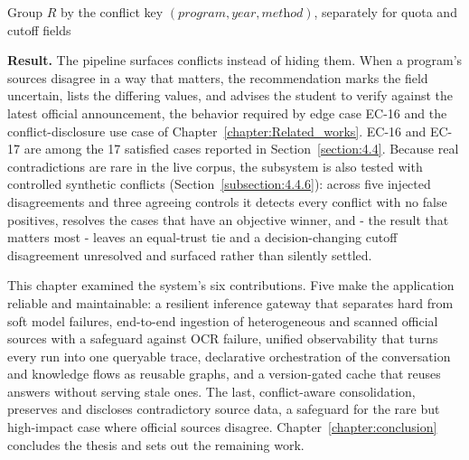 \documentclass[../main.tex]{subfiles}
\begin{document}
\begin{algorithm}[H]
\caption{Conflict detection and resolution (per recommended program)}
\label{alg:conflict}
Group $R$ by the conflict key $(\textit{program}, \textit{year}, \textit{method})$, separately for quota and cutoff fields\;
\end{algorithm}

\textbf{Result.}
The pipeline surfaces conflicts instead of hiding them.
When a program's sources disagree in a way that matters, the recommendation marks the field uncertain, lists the differing values, and advises the student to verify against the latest official announcement, the behavior required by edge case EC-16 and the conflict-disclosure use case of Chapter~\ref{chapter:Related_works}.
EC-16 and EC-17 are among the 17 satisfied cases reported in Section~\ref{section:4.4}.
Because real contradictions are rare in the live corpus, the subsystem is also tested with controlled synthetic conflicts (Section~\ref{subsection:4.4.6}): across five injected disagreements and three agreeing controls it detects every conflict with no false positives, resolves the cases that have an objective winner, and - the result that matters most - leaves an equal-trust tie and a decision-changing cutoff disagreement unresolved and surfaced rather than silently settled.

This chapter examined the system's six contributions.
Five make the application reliable and maintainable: a resilient inference gateway that separates hard from soft model failures, end-to-end ingestion of heterogeneous and scanned official sources with a safeguard against \gls{OCR} failure, unified observability that turns every run into one queryable trace, declarative orchestration of the conversation and knowledge flows as reusable graphs, and a version-gated cache that reuses answers without serving stale ones.
The last, conflict-aware consolidation, preserves and discloses contradictory source data, a safeguard for the rare but high-impact case where official sources disagree.
Chapter~\ref{chapter:conclusion} concludes the thesis and sets out the remaining work.
\end{document}

